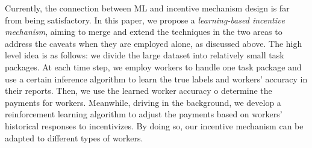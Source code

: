 Currently, the connection between ML and incentive mechanism design is far from being satisfactory. In this paper, we propose a \emph{learning-based incentive mechanism}, aiming to merge and extend the techniques in the two areas to address the caveats when they are employed alone, as discussed above.
The high level idea is as follows: we divide the large dataset into relatively small task packages. At each time step, we employ workers to handle one task package and use a certain inference algorithm to learn the true labels and workers' accuracy in their reports. Then, we use the learned worker accuracy o determine the payments for workers. Meanwhile, driving in the background, we develop a reinforcement learning algorithm to adjust the payments based on workers' historical responses to incentivizes. By doing so, our incentive mechanism can be adapted to different types of workers.



